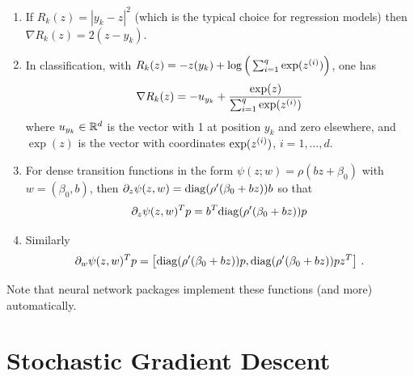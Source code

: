  \begin{enumerate}[label=$\bullet$,wide=0.5cm]
\item If $R_k(z) = |y_k - z|^2$ (which is the typical choice for regression models) then $\nabla R_k(z) = 2 (z-y_k)$. 
\item In classification, with $R_k(z) = - z(y_k) + \log \Big(\sum_{i=1}^q \exp(z^{(i)})\Big)$, one has
\[
\nabla R_k(z) = - u_{y_k} +   \frac{\exp(z)}{\sum_{i=1}^q \exp(z^{(i)})}
\]
where $u_{y_k}\in {\mathbb{R}}^d$ is the vector with 1 at position $y_k$ and zero elsewhere, and $\exp(z)$ is the vector with coordinates $\exp(z^{(i)})$, $i=1, \ldots, d$.
\item For dense transition functions in the form $\psi(z; w) = \rho(bz+\beta_0)$ with $w = (\beta_0, b)$, then $\partial_z \psi(z, w) = \mathrm{diag}(\rho'(\beta_0 + bz)) b$ so that
\[
\partial_z \psi(z, w)^T p =  b^T \mathrm{diag}(\rho'(\beta_0 + bz))p
\]
\item
Similarly
\[
\partial_w \psi(z, w)^T p =  \left[ \mathrm{diag}(\rho'(\beta_0 + bz))p, \mathrm{diag}(\rho'(\beta_0 + bz))pz^T\right] \,. 
\]
\end{enumerate}
Note that neural network packages implement these functions (and more) automatically.
 
\section{Stochastic Gradient Descent}

